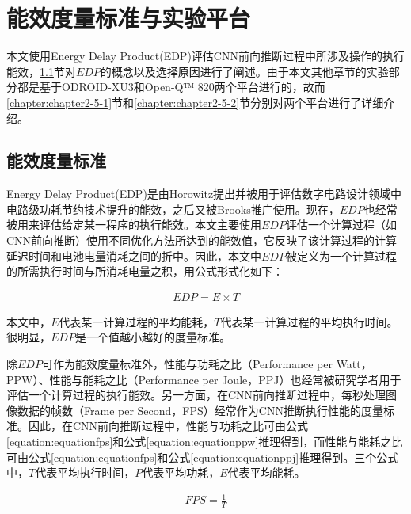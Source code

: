 \section{能效度量标准与实验平台}
\label{chapter:ch2-4}
本文使用Energy Delay Product(EDP)\cite{horowitz1994low}评估CNN前向推断过程中所涉及操作的执行能效，\ref{chapter:edp}节对$EDP$的概念以及选择原因进行了阐述。由于本文其他章节的实验部分都是基于ODROID-XU3\cite{hardkernel.com}和Open-Q™ 820\cite{intrinsyc.com}两个平台进行的，故而\ref{chapter:chapter2-5-1}节和\ref{chapter:chapter2-5-2}节分别对两个平台进行了详细介绍。

\subsection{能效度量标准}
\label{chapter:edp}

Energy Delay Product(EDP)是由Horowitz提出并被用于评估数字电路设计领域中电路级功耗节约技术提升的能效，之后又被Brooks推广使用\cite{brooks2000power}。现在，$EDP$也经常被用来评估给定某一程序的执行能效。本文主要使用$EDP$评估一个计算过程（如CNN前向推断）使用不同优化方法所达到的能效值，它反映了该计算过程的计算延迟时间和电池电量消耗之间的折中。因此，本文中$EDP$被定义为一个计算过程的所需执行时间与所消耗电量之积，用公式形式化如下：

\begin{equation}
     \label{equation:equation1}
     \begin{aligned}
        EDP = E \times T
     \end{aligned}
\end{equation}

\noindent 本文中，$E$代表某一计算过程的平均能耗，$T$代表某一计算过程的平均执行时间。很明显，$EDP$是一个值越小越好的度量标准。

除$EDP$可作为能效度量标准外，性能与功耗之比（Performance per Watt，PPW）、性能与能耗之比（Performance per Joule，PPJ）也经常被研究学者用于评估一个计算过程的执行能效。另一方面，在CNN前向推断过程中，每秒处理图像数据的帧数（Frame per Second，FPS\cite{wang2017building}）经常作为CNN推断执行性能的度量标准。因此，在CNN前向推断过程中，性能与功耗之比可由公式\ref{equation:equationfps}和公式\ref{equation:equationppw}推理得到，而性能与能耗之比可由公式\ref{equation:equationfps}和公式\ref{equation:equationppj}推理得到。三个公式中，$T$代表平均执行时间，$P$代表平均功耗，$E$代表平均能耗。

\begin{equation}
     \label{equation:equationfps}
     \begin{aligned}
        FPS = \frac{1}{T}
     \end{aligned}
\end{equation}

